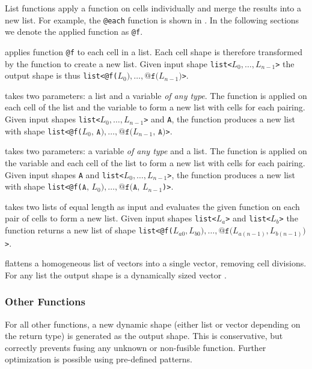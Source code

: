 List functions apply a function on cells individually and merge the results into a new list.
For example, the \texttt{@each} function is shown in . In the
following sections we denote the applied function as \texttt{@f}.

\sloppy %
 applies function \texttt{@f} to each cell in a list. Each cell shape
is therefore transformed by the function to create a new list. Given input shape
\texttt{list<$L_0, \ldots, L_{n-1}$>} the output shape is thus
\texttt{list<@f($L_0\texttt{)}, \ldots, \texttt{@f(}L_{n-1}\texttt{)}$>}.
 
 takes two parameters: a list and a variable \textit{of any type}.
The function is applied on each cell of the list and the variable to form a new list with cells for
each pairing. Given input shapes \texttt{list<$L_0, \ldots, L_{n-1}$>} and \texttt{A}, the function
produces a new list with shape \texttt{list<@f($L_0\texttt{, A)}, \ldots, \texttt{@f(}L_{n-1}\texttt{, A)}$>}.

 takes two parameters: a variable \textit{of any type} and a list.
The function is applied on the variable and each cell of the list to form a new list with cells for
each pairing. Given input shapes \texttt{A} and \texttt{list<$L_0, \ldots, L_{n-1}$>}, the function
produces a new list with shape \texttt{list<@f($\texttt{A, }L_0\texttt{)}, \ldots, \texttt{@f(A, }L_{n-1}$)>}.

 takes two lists of equal length as input and evaluates the given
function on each pair of cells to form a new list. Given input shapes \texttt{list<$L_a$>} and
\texttt{list<$L_b$>} the function returns a new list of shape
\texttt{list<@f($L_{a0}, L_{b0}\texttt{)}, \ldots, \texttt{@f(}L_{a(n-1)}, L_{b(n-1)}\texttt{)}$>}.

 flattens a homogeneous list of vectors into a single vector, removing cell
divisions. For any list the output shape is a dynamically sized vector .

\subsubsection{Other Functions}

For all other functions, a new dynamic shape (either list or vector depending on the return type) is 
generated as the output shape. This is conservative, but correctly prevents fusing any unknown or
non-fusible function. Further optimization is possible using pre-defined patterns.
